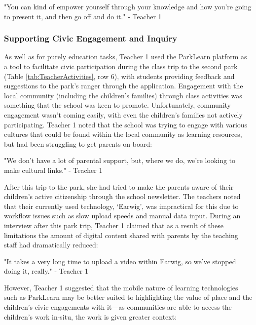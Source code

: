 \begin{displayquote}
"You can kind of empower yourself through your knowledge and how you’re going to present it, and then go off and do it." - Teacher 1
\end{displayquote}


\subsubsection{Supporting Civic Engagement and Inquiry}

As well as for purely education tasks, Teacher 1 used the ParkLearn platform as a tool to facilitate civic participation during the class trip to the second park (Table \ref{tab:TeacherActivities}, row 6), with students providing feedback and suggestions to the park's ranger through the application. Engagement with the local community (including the children's families) through class activities was something that the school was keen to promote. Unfortunately, community engagement wasn't coming easily, with even the children's families not actively participating. Teacher 1 noted that the school was trying to engage with various cultures that could be found within the local community as learning resources, but had been struggling to get parents on board: 

\begin{displayquote}
"We don’t have a lot of parental support, but, where we do, we’re looking to make cultural links." - Teacher 1
\end{displayquote}

After this trip to the park, she had tried to make the parents aware of their children’s active citizenship through the school newsletter. The teachers noted that their currently used technology, `Earwig', was impractical for this due to workflow issues such as slow upload speeds and manual data input. During an interview after this park trip, Teacher 1 claimed that as a result of these limitations the amount of digital content shared with parents by the teaching staff had dramatically reduced:

\begin{displayquote}
"It takes a very long time to upload a video within Earwig, so we've stopped doing it, really." - Teacher 1
\end{displayquote}

However, Teacher 1 suggested that the mobile nature of learning technologies such as ParkLearn may be better suited to highlighting the value of place and the children’s civic engagements with it---as communities are able to access the children's work in-situ, the work is given greater context: 

